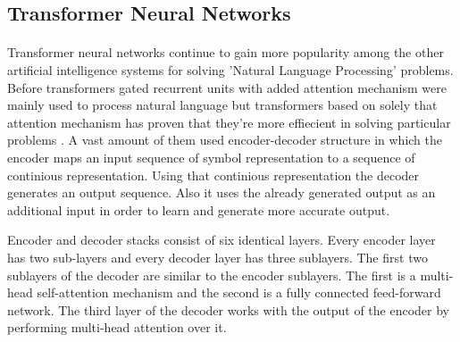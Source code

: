 \documentclass[12pt]{report}
\begin{document}
    \subsection*{Transformer Neural Networks}
    \paragraph{}

    Transformer neural networks continue to gain more popularity among the other artificial intelligence systems for solving 'Natural Language Processing' problems.
    Before transformers gated recurrent units with added attention mechanism were mainly used to process natural language but transformers based on solely that attention mechanism
    has proven that they're more effiecient in solving particular problems \citep{attention_is_all_you_need}. A vast amount of them used encoder-decoder structure in which the encoder maps
    an input sequence of symbol representation to a sequence of continious representation. Using that continious representation the decoder generates an output sequence. Also it uses the
    already generated output as an additional input in order to learn and generate more accurate output.

    Encoder and decoder stacks consist of six identical layers. Every encoder layer has two sub-layers and every decoder layer has three sublayers. The first two sublayers of the decoder are 
    similar to the encoder sublayers. The first is a multi-head self-attention mechanism and the second is a fully connected feed-forward network. The third layer of the decoder works with the output
    of the encoder by performing multi-head attention over it.

    \clearpage
\end{document}
